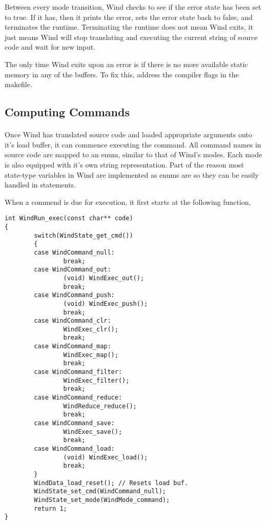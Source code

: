 \par Between every mode transition, Wind checks to see if the error state has been set to true. If it has, then it prints the error, sets the error state back to false, and terminates the runtime. Terminating the runtime does not mean Wind exits, it just means Wind will stop translating and executing the current string of source code and wait for new input. 
\par The only time Wind exits upon an error is if there is no more available static memory in any of the buffers. To fix this, address the compiler flags in the makefile.

\subsection{Computing Commands}

\paragraph{  } Once Wind has translated source code and loaded appropriate arguments onto it's load buffer, it can commence executing the command. All command names in source code are mapped to an enum, similar to that of Wind's modes. Each mode is also equipped with it's own string representation. Part of the reason most state-type variables in Wind are implemented as enums are so they can be easily handled in  statements.

\par When a commend is due for execution, it first starts at the following function, 

\begin{lstlisting}[style=numc]
int WindRun_exec(const char** code)
{
        switch(WindState_get_cmd())
        {
        case WindCommand_null:
                break;
        case WindCommand_out:
                (void) WindExec_out();
                break;
        case WindCommand_push:
                (void) WindExec_push();
                break;
        case WindCommand_clr:
                WindExec_clr();
                break;
        case WindCommand_map:
                WindExec_map();
                break;
        case WindCommand_filter:
                WindExec_filter();
                break;
        case WindCommand_reduce:
                WindReduce_reduce();
                break;
        case WindCommand_save:
                WindExec_save();
                break;
        case WindCommand_load:
                (void) WindExec_load();
                break;
        }
        WindData_load_reset(); // Resets load buf.
        WindState_set_cmd(WindCommand_null);
        WindState_set_mode(WindMode_command);
        return 1;
}
\end{lstlisting}


